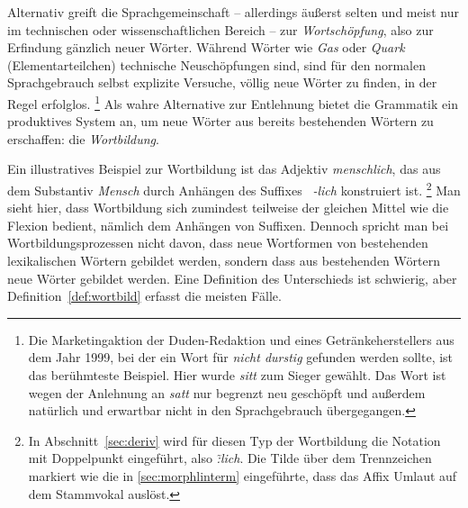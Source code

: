 \begin{exe}
  \ex \label{ex:morph5510}
  \begin{xlist}
  \end{xlist}
\end{exe}

Alternativ greift die Sprachgemeinschaft -- allerdings äußerst selten und meist nur im technischen oder wissenschaftlichen Bereich -- zur \textit{Wortschöpfung}, also zur Erfindung gänzlich neuer Wörter.
Während Wörter wie \textit{Gas} oder \textit{Quark} (Elementarteilchen) technische Neuschöpfungen sind, sind für den normalen Sprachgebrauch selbst explizite Versuche, völlig neue Wörter zu finden, in der Regel erfolglos.%
\footnote{Die Marketingaktion der Duden-Redaktion und eines Getränkeherstellers aus dem Jahr 1999, bei der ein Wort für \textit{nicht durstig} gefunden werden sollte, ist das berühmteste Beispiel.
Hier wurde \textit{sitt} zum Sieger gewählt.
Das Wort ist wegen der Anlehnung an \textit{satt} nur begrenzt neu geschöpft und außerdem natürlich und erwartbar nicht in den Sprachgebrauch übergegangen.}
Als wahre Alternative zur Entlehnung bietet die Grammatik ein produktives System an, um neue Wörter aus bereits bestehenden Wörtern zu erschaffen: die \textit{Wortbildung}.

Ein illustratives Beispiel zur Wortbildung ist \zB das Adjektiv \textit{menschlich}, das aus dem Substantiv \textit{Mensch} durch Anhängen des Suffixes \textit{~-lich} konstruiert ist.%
\footnote{In Abschnitt~\ref{sec:deriv} wird für diesen Typ der Wortbildung die Notation mit Doppelpunkt eingeführt, also \textit{\~:lich}.
Die Tilde über dem Trennzeichen markiert wie die in \ref{sec:morphlinterm} eingeführte, dass das Affix Umlaut auf dem Stammvokal auslöst.}
Man sieht hier, dass Wortbildung sich zumindest teilweise der gleichen Mittel wie die Flexion bedient, nämlich \zB dem Anhängen von Suffixen.
Dennoch spricht man bei Wortbildungsprozessen nicht davon, dass neue Wortformen von bestehenden lexikalischen Wörtern gebildet werden, sondern dass aus bestehenden Wörtern neue Wörter gebildet werden.
Eine Definition des Unterschieds ist schwierig, aber Definition~\ref{def:wortbild} erfasst die meisten Fälle.

